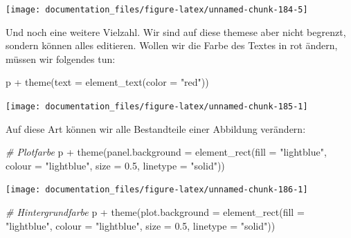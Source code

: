 \documentclass[
]{article}
\newenvironment{Shaded}{\begin{snugshade}}{\end{snugshade}}
\newcommand{\AttributeTok}[1]{\textcolor[rgb]{0.77,0.63,0.00}{#1}}
\newcommand{\CommentTok}[1]{\textcolor[rgb]{0.56,0.35,0.01}{\textit{#1}}}
\newcommand{\FloatTok}[1]{\textcolor[rgb]{0.00,0.00,0.81}{#1}}
\newcommand{\FunctionTok}[1]{\textcolor[rgb]{0.00,0.00,0.00}{#1}}
\newcommand{\NormalTok}[1]{#1}
\newcommand{\SpecialCharTok}[1]{\textcolor[rgb]{0.00,0.00,0.00}{#1}}
\newcommand{\StringTok}[1]{\textcolor[rgb]{0.31,0.60,0.02}{#1}}
\begin{document}
\begin{center}\texttt{[image: documentation\_files/figure-latex/unnamed-chunk-184-5]} \end{center}

Und noch eine weitere Vielzahl. Wir sind auf diese themese aber nicht begrenzt, sondern können alles editieren. Wollen wir die Farbe des Textes in rot ändern, müssen wir folgendes tun:

\begin{Shaded}
\begin{Highlighting}[]
\NormalTok{p }\SpecialCharTok{+} \FunctionTok{theme}\NormalTok{(}\AttributeTok{text =} \FunctionTok{element\_text}\NormalTok{(}\AttributeTok{color =} \StringTok{"red"}\NormalTok{))}
\end{Highlighting}
\end{Shaded}

\begin{center}\texttt{[image: documentation\_files/figure-latex/unnamed-chunk-185-1]} \end{center}

Auf diese Art können wir alle Bestandteile einer Abbildung verändern:

\begin{Shaded}
\begin{Highlighting}[]
\CommentTok{\# Plotfarbe}
\NormalTok{p }\SpecialCharTok{+} \FunctionTok{theme}\NormalTok{(}\AttributeTok{panel.background =} \FunctionTok{element\_rect}\NormalTok{(}\AttributeTok{fill =} \StringTok{"lightblue"}\NormalTok{,}
                                \AttributeTok{colour =} \StringTok{"lightblue"}\NormalTok{,}
                                \AttributeTok{size =} \FloatTok{0.5}\NormalTok{, }\AttributeTok{linetype =} \StringTok{"solid"}\NormalTok{))}
\end{Highlighting}
\end{Shaded}

\begin{center}\texttt{[image: documentation\_files/figure-latex/unnamed-chunk-186-1]} \end{center}

\begin{Shaded}
\begin{Highlighting}[]

\CommentTok{\# Hintergrundfarbe }
\NormalTok{p }\SpecialCharTok{+} \FunctionTok{theme}\NormalTok{(}\AttributeTok{plot.background =} \FunctionTok{element\_rect}\NormalTok{(}\AttributeTok{fill =} \StringTok{"lightblue"}\NormalTok{,}
                                \AttributeTok{colour =} \StringTok{"lightblue"}\NormalTok{,}
                                \AttributeTok{size =} \FloatTok{0.5}\NormalTok{, }\AttributeTok{linetype =} \StringTok{"solid"}\NormalTok{))}
\end{Highlighting}
\end{Shaded}
\end{document}
